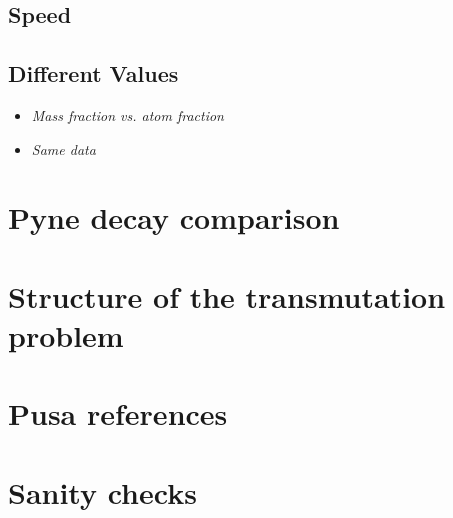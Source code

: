 \documentclass{article}
\begin{document}
\subsection{Speed}
\subsection{Different Values}
\begin{itemize}
\item \it{Mass fraction vs. atom fraction}
\item \it{Same data}
\end{itemize}

\section{Pyne decay comparison}

\section{Structure of the transmutation problem}

\section{Pusa references}

\section{Sanity checks}


\end{document}

